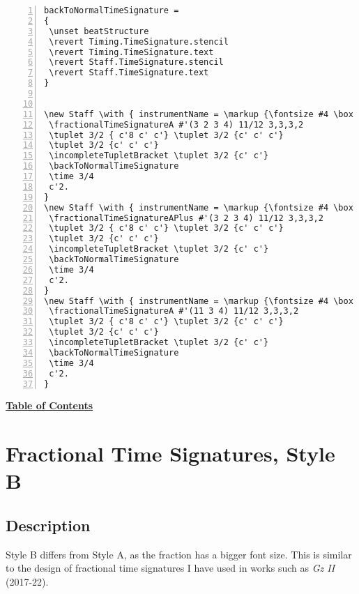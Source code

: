 \begin{Verbatim}[numbers=left,xleftmargin=5mm]
backToNormalTimeSignature =
{
 \unset beatStructure
 \revert Timing.TimeSignature.stencil
 \revert Timing.TimeSignature.text
 \revert Staff.TimeSignature.stencil
 \revert Staff.TimeSignature.text
}


\new Staff \with { instrumentName = \markup {\fontsize #4 \box "A"}} {
 \fractionalTimeSignatureA #'(3 2 3 4) 11/12 3,3,3,2
 \tuplet 3/2 { c'8 c' c'} \tuplet 3/2 {c' c' c'}
 \tuplet 3/2 {c' c' c'}
 \incompleteTupletBracket \tuplet 3/2 {c' c'}
 \backToNormalTimeSignature
 \time 3/4
 c'2.
}
\new Staff \with { instrumentName = \markup {\fontsize #4 \box "B"}} {
 \fractionalTimeSignatureAPlus #'(3 2 3 4) 11/12 3,3,3,2
 \tuplet 3/2 { c'8 c' c'} \tuplet 3/2 {c' c' c'}
 \tuplet 3/2 {c' c' c'}
 \incompleteTupletBracket \tuplet 3/2 {c' c'}
 \backToNormalTimeSignature
 \time 3/4
 c'2.
}
\new Staff \with { instrumentName = \markup {\fontsize #4 \box "C"}} {
 \fractionalTimeSignatureA #'(11 3 4) 11/12 3,3,3,2
 \tuplet 3/2 { c'8 c' c'} \tuplet 3/2 {c' c' c'}
 \tuplet 3/2 {c' c' c'}
 \incompleteTupletBracket \tuplet 3/2 {c' c'}
 \backToNormalTimeSignature
 \time 3/4
 c'2.
}

\end{Verbatim}

\hyperref[sec:toc]{\textbf{Table of Contents}}

\vfill \break



\section {Fractional Time Signatures, Style B}

\hfill
{}
\hfill

\subsection{Description}
Style B differs from Style A, as the fraction has a bigger font size. This is similar to the design of fractional time signatures I have used in works such as \textit{Gz II} (2017-22).\autocite{RN1748}  

